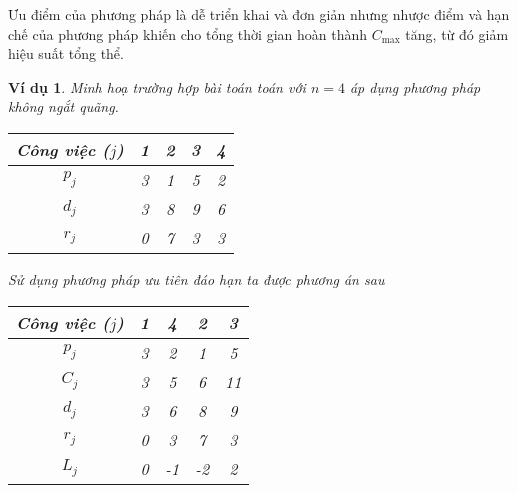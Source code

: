 \documentclass[12pt,a4paper]{report}
\newtheorem{vd}{Ví dụ}
\begin{document}
Ưu điểm của phương pháp là dễ triển khai và đơn giản nhưng nhược điểm và hạn chế của phương pháp khiến cho tổng thời gian hoàn thành $C_{\max}$ tăng, từ đó giảm hiệu suất tổng thể.
\begin{vd} \label{kongatquang}
Minh hoạ trường hợp bài toán toán với $n=4$ áp dụng phương pháp không ngắt quãng.
\begin{table}[h!]
	\centering
		\begin{tabular}{|c | c c c c |} 
		\hline
		Công việc ($j$) & 1 & 2 & 3 & 4 \\
		\hline\hline
		$p_j$ & 3 & 1 & 5 & 2 \\
		\hline
		$d_j$ & 3 & 8 & 9 & 6 \\
		\hline
		$r_j$ & 0 & 7 & 3 & 3 \\
		\hline
		\end{tabular}
\end{table}

Sử dụng phương pháp ưu tiên đáo hạn ta được phương án sau
\begin{table}[h!]
	\centering
		\begin{tabular}{|c | c c c c |} 
		\hline
		Công việc ($j$) & 1 & 4 & 2 & 3 \\
		\hline\hline
		$p_j$ & 3 & 2 & 1 & 5 \\
		\hline
		$C_j$ & 3 & 5 & 6 & 11 \\
		\hline
		$d_j$ & 3 & 6 & 8 & 9 \\
		\hline
		$r_j$ & 0 & 3 & 7 & 3 \\
		\hline
		$L_j$ & 0 & -1 & -2 & 2 \\
		\hline
		\end{tabular}
\end{table}


\end{vd}
\end{document}
